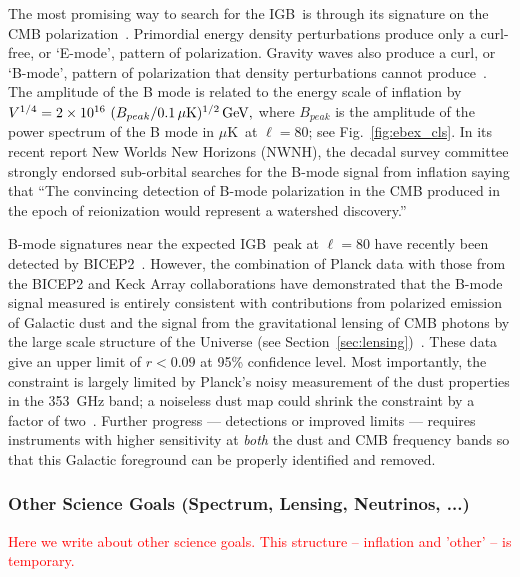 \documentclass[12pt]{article}
\def\igb{IGB}
\def\microk{$\mu{\mbox{K}}$}
\newcommand{\comred}[1]{\textcolor{red}{#1}}
\begin{document}
The most promising way to search for the \igb\ is through its signature on the CMB polarization~\cite{kamionkowski97b,seljak97}.  
Primordial energy density perturbations produce only a curl-free, or `E-mode', pattern of polarization.
Gravity waves also produce a curl, or `B-mode', pattern of polarization that density perturbations cannot
produce~\cite{kamionkowski97a,zaldarriaga97}.  The amplitude of the B mode is related to the energy scale
of inflation by $V^{1/4}=2\times10^{16} \ ( B_{peak} / 0.1\,\mu{\rm
K})^{1/2} \,{\rm GeV},$ where $B_{peak}$ is the amplitude of the power spectrum of the B mode in \microk\ at $\ell=80$;
see Fig.~\ref{fig:ebex_cls}. In its recent report New Worlds New Horizons (NWNH), the decadal survey 
committee strongly endorsed sub-orbital searches for the B-mode signal from 
inflation saying that ``The convincing detection of B-mode polarization in the CMB produced in the 
epoch of reionization would represent a watershed discovery.''~\cite{blandford2010}

B-mode signatures near the expected \igb\ peak at $\ell=80$ have recently been detected by BICEP2~\cite{bicep2Bmode}. 
However, the combination of Planck data with those from the BICEP2 and Keck Array collaborations have demonstrated 
that the B-mode signal measured is entirely consistent with contributions from polarized emission of Galactic dust and the 
signal from the gravitational lensing of CMB photons by the large scale structure of the Universe (see 
Section~\ref{sec:lensing})~\cite{bkp2015,planck2014-XXX,2016PhRvL.116c1302B}. 
These data give an upper limit of $r<0.09$ at 95\% confidence level.
Most importantly, the constraint is largely limited by Planck's noisy measurement of the dust properties in the 353~GHz band; 
a noiseless dust map could shrink the constraint by a factor of two~\cite{bkp2015}. 
Further progress --- detections or improved limits --- requires instruments 
with higher sensitivity at {\it both} the dust and CMB frequency bands so that this Galactic foreground can be properly identified 
and removed. 

\vspace{-0.22in}

\subsubsection{Other Science Goals (Spectrum, Lensing, Neutrinos, ...)}

\comred{Here we write about other science goals. This structure -- inflation and 'other' -- is temporary. }
\end{document}
